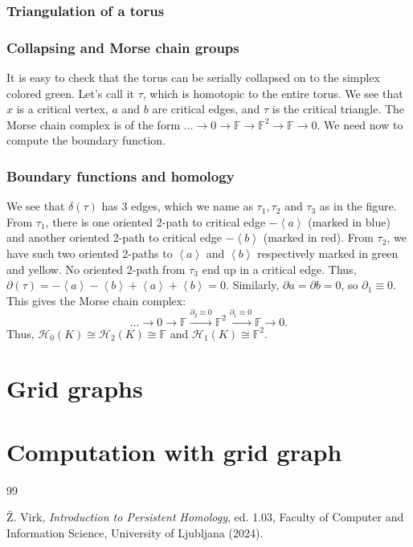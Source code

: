\documentclass[a4paper,11pt, tikz]{article}
\newcommand{\lb}{\left(}
\newcommand{\rb}{\right)}
\renewcommand{\la}{\left\langle}
\renewcommand{\ra}{\right\rangle}
\newcommand{\bF}{\mathbb{F}}
\renewcommand{\t}{\tau}
\newcommand{\dt}{\delta}
\newcommand{\dl}{\partial}
\newcommand{\cH}{\mathcal{H}}
\newcommand{\tends}{\rightarrow}
\begin{document}
\subsubsection{Triangulation of a torus}
\subsubsection{Collapsing and Morse chain groups}
It is easy to check that the torus can be serially collapsed on to the simplex colored green. Let's call it $\t$, which is homotopic to the entire torus. We see that $x$ is a critical vertex, $a$ and $b$ are critical edges, and $\t$ is the critical triangle. The Morse chain complex is of the form $\dots\tends 0\tends \bF\tends \bF^2\tends \bF\tends 0$. We need now to compute the boundary function.
\subsubsection{Boundary functions and homology}
We see that $\dt\lb \t\rb$ has 3 edges, which we name as $\t_1, \t_2$ and $\t_3$ as in the figure. From $\t_1$, there is one oriented 2-path to critical edge $-\la a\ra$ (marked in blue) and another oriented 2-path to critical edge $-\la b\ra$ (marked in red). From $\t_2$, we have such two oriented 2-paths to $\la a\ra$ and $\la b\ra$ respectively marked in green and yellow. No oriented 2-path from $\t_3$ end up in a critical edge. Thus, $\dl\lb \t\rb=-\la a\ra-\la b \ra+\la a \ra+\la b \ra=0$. Similarly, $\dl a=\dl b=0$, so $\dl_1\equiv 0$. This gives the Morse chain complex:
$$\dots\tends 0\tends \bF\xrightarrow{\dl_2\equiv 0} \bF^2\xrightarrow{\dl_1\equiv 0} \bF\tends 0.$$
Thus, $\cH_0\lb K\rb\cong \cH_2\lb K\rb \cong \bF$ and $\cH_1\lb K\rb\cong\bF^2$.
\section{Grid graphs}
\section{Computation with grid graph}
 \begin{thebibliography}{99}

\v{Z}. Virk, \emph{Introduction to Persistent Homology}, ed. 1.03, Faculty of Computer and Information Science, University of Ljubljana (2024).
  \end{thebibliography}
\end{document}
